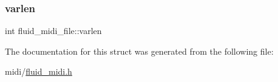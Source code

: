 \mbox{\label{structfluid__midi__file_a67123221394c6191e4b9b8313449efab}} 
\subsubsection{\texorpdfstring{varlen}{varlen}}
{\footnotesize\ttfamily int fluid\+\_\+midi\+\_\+file\+::varlen}



The documentation for this struct was generated from the following file\+:\begin{DoxyCompactItemize}
\item 
midi/\hyperlink{fluid__midi_8h}{fluid\+\_\+midi.\+h}\end{DoxyCompactItemize}
